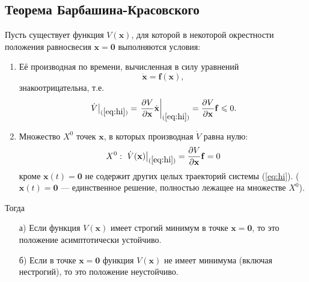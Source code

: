 \documentclass[a4paper]{article}
\begin{document}
\subsection{Теорема Барбашина-Красовского}
\begin{thm}
	Пусть существует функция $V(\mathbf{x})$, для которой в некоторой окрестности
	положения равносвесия $\mathbf{x}=\mathbf{0}$ выполняются условия:
	\begin{enumerate}
		\item Её производная по времени, вычисленная в силу уравнений
			\[
				\dot{\mathbf{x}}=\mathbf{f}(\mathbf{x}) \tag{*}
				\label{eq:hi}
			,\]
		знакоотрицательна, т.\:е.
		\[
			\left. \dot{V}  \right|_{(\ref{eq:hi})}=
			\left.\frac{\partial V}{\partial \mathbf{x}} \dot{\mathbf{x}}
			\right|_{(\ref{eq:hi})}=\frac{\partial V}{\partial  \mathbf{x}}
			\mathbf{f}\le 0
		.\]
		\item Множество $X^0$ точек  $\mathbf{x}$, в которых
			производная $\dot{V}$ равна нулю:
 \[
	 X^0:\: \left.\dot{V}(\mathbf{x})\right|_{(\ref{eq:hi})}=
		 \frac{\partial V}{\partial \mathbf{x}}\mathbf{f}=0 
 \]
 кроме $\mathbf{x}(t)=\mathbf{0}$ не содержит других целых траекторий системы
 (\ref{eq:hi}). ($\mathbf{x}(t)=\mathbf{0}$ --- единственное решение, полностью
 лежащее на множестве $X^0$).
	\end{enumerate}
	Тогда
	\begin{itemize}
		\item[а)] Если функция $V(\mathbf{x})$ имеет строгий минимум в
			точке $\mathbf{x}=\mathbf{0}$, то это положение
			асимптотически устойчиво.
		\item[б)] Если в точке $\mathbf{x}=\mathbf{0}$ функция
				$V(\mathbf{x})$ не имеет минимума (включая
				нестрогий), то это положение
				неустойчиво.
	\end{itemize}
\end{thm}
\end{document}
